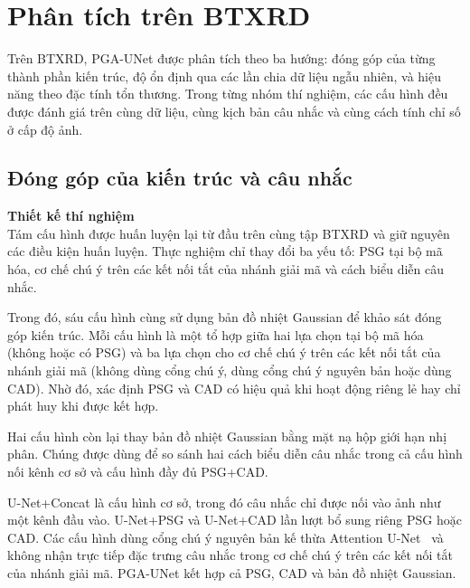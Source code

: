 \section{Phân tích trên BTXRD}
\label{subsec:arch_btxrd}

Trên BTXRD, PGA-UNet được phân tích theo ba hướng: đóng góp của từng thành phần kiến trúc, độ ổn định qua các lần chia dữ liệu ngẫu nhiên, và hiệu năng theo đặc tính tổn thương. Trong từng nhóm thí nghiệm, các cấu hình đều được đánh giá trên cùng dữ liệu, cùng kịch bản câu nhắc và cùng cách tính chỉ số ở cấp độ ảnh.

\subsection{Đóng góp của kiến trúc và câu nhắc}
\label{subsec:ablation_arch}

\noindent\textbf{Thiết kế thí nghiệm}\\
Tám cấu hình được huấn luyện lại từ đầu trên cùng tập BTXRD và giữ nguyên các điều kiện huấn luyện. Thực nghiệm chỉ thay đổi ba yếu tố: PSG tại bộ mã hóa, cơ chế chú ý trên các kết nối tắt của nhánh giải mã và cách biểu diễn câu nhắc.

Trong đó, sáu cấu hình cùng sử dụng bản đồ nhiệt Gaussian để khảo sát đóng góp kiến trúc. Mỗi cấu hình là một tổ hợp giữa hai lựa chọn tại bộ mã hóa (không hoặc có PSG) và ba lựa chọn cho cơ chế chú ý trên các kết nối tắt của nhánh giải mã (không dùng cổng chú ý, dùng cổng chú ý nguyên bản hoặc dùng CAD). Nhờ đó, xác định PSG và CAD có hiệu quả khi hoạt động riêng lẻ hay chỉ phát huy khi được kết hợp.

Hai cấu hình còn lại thay bản đồ nhiệt Gaussian bằng mặt nạ hộp giới hạn nhị phân. Chúng được dùng để so sánh hai cách biểu diễn câu nhắc trong cả cấu hình nối kênh cơ sở và cấu hình đầy đủ PSG+CAD.

U-Net+Concat là cấu hình cơ sở, trong đó câu nhắc chỉ được nối vào ảnh như một kênh đầu vào. U-Net+PSG và U-Net+CAD lần lượt bổ sung riêng PSG hoặc CAD. Các cấu hình dùng cổng chú ý nguyên bản kế thừa Attention U-Net~\cite{oktay2018attentionunet} và không nhận trực tiếp đặc trưng câu nhắc trong cơ chế chú ý trên các kết nối tắt của nhánh giải mã. PGA-UNet kết hợp cả PSG, CAD và bản đồ nhiệt Gaussian.

